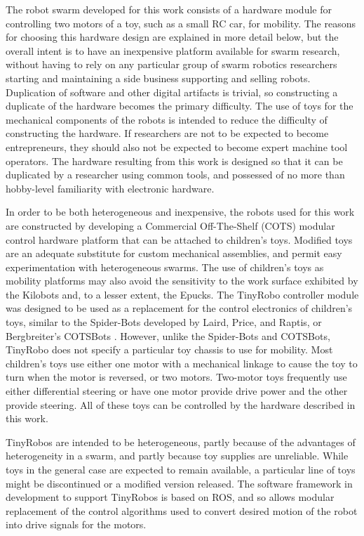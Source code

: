 \documentclass[]{article}
\begin{document}
The robot swarm developed for this work consists of a hardware module for controlling two motors of a toy, such as a small RC car, for mobility. 
The reasons for choosing this hardware design are explained in more detail below, but the overall intent is to have an inexpensive platform available for swarm research, without having to rely on any particular group of swarm robotics researchers starting and maintaining a side business supporting and selling robots.
Duplication of software and other digital artifacts is trivial, so constructing a duplicate of the hardware becomes the primary difficulty. 
The use of toys for the mechanical components of the robots is intended to reduce the difficulty of constructing the hardware. 
If researchers are not to be expected to become entrepreneurs, they should also not be expected to become expert machine tool operators.
The hardware resulting from this work is designed so that it can be duplicated by a researcher using common tools, and possessed of no more than hobby-level familiarity with electronic hardware.

In order to be both heterogeneous and inexpensive, the robots used for this work are constructed by developing a Commercial Off-The-Shelf (COTS) modular control hardware platform that can be attached to children's toys. 
Modified toys are an adequate substitute for custom mechanical assemblies, and permit easy experimentation with heterogeneous swarms. 
The use of children's toys as mobility platforms may also avoid the sensitivity to the work surface exhibited by the Kilobots and, to a lesser extent, the Epucks.
The TinyRobo controller module was designed to be used as a replacement for the control electronics of children's toys, similar to the Spider-Bots developed by Laird, Price, and Raptis, or Bergbreiter's COTSBots \cite{lairdspider, bergbreiter2003cotsbots}.
However, unlike the Spider-Bots and COTSBots, TinyRobo does not specify a particular toy chassis to use for mobility. 
Most children's toys use either one motor with a mechanical linkage to cause the toy to turn when the motor is reversed, or two motors.
Two-motor toys frequently use either differential steering or have one motor provide drive power and the other provide steering. 
All of these toys can be controlled by the hardware described in this work. 

TinyRobos are intended to be heterogeneous, partly because of the advantages of heterogeneity in a swarm, and partly because toy supplies are unreliable.
While toys in the general case are expected to remain available, a particular line of toys might be discontinued or a modified version released. 
The software framework in development to support TinyRobos is based on ROS, and so allows modular replacement of the control algorithms used to convert desired motion of the robot into drive signals for the motors. 
\end{document}
